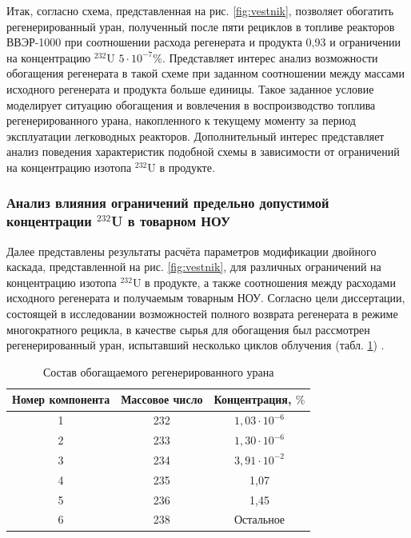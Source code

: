Итак, согласно \cite{smirnovObogashchenieRegenerirovannogoUrana2018} схема, представленная на рис. \ref{fig:vestnik}, позволяет обогатить регенерированный уран, полученный после пяти рециклов в топливе реакторов ВВЭР-1000 при соотношении расхода регенерата и продукта 0,93 и ограничении на концентрацию $^{232}$U $5\cdot10^{-7}$\%. Представляет интерес анализ возможности обогащения регенерата в такой схеме при заданном соотношении между массами исходного регенерата и продукта больше единицы. Такое заданное условие моделирует ситуацию обогащения и вовлечения в воспроизводство топлива регенерированного урана, накопленного к текущему моменту за период эксплуатации легководных реакторов. Дополнительный интерес представляет анализ поведения характеристик подобной схемы в зависимости от ограничений на концентрацию изотопа $^{232}$U в продукте. 

\subsubsection{Анализ влияния ограничений предельно допустимой концентрации $^{232}$U в товарном НОУ}

Далее представлены результаты расчёта параметров модификации двойного каскада, представленной на рис. \ref{fig:vestnik}, для различных ограничений на концентрацию изотопа $^{232}$U в продукте, а также соотношения между расходами исходного регенерата и получаемым товарным НОУ.
Согласно цели диссертации, состоящей в исследовании возможностей полного возврата регенерата в режиме многократного рецикла, в качестве сырья для обогащения был рассмотрен регенерированный уран, испытавший несколько циклов облучения (табл. \ref{RepU_fifth}) \cite{palkinDesignanalyticalResearchRefinement2010}.

\begin{table}
  \begin{tabular}{c|c|c} 
  \hline
  Номер компонента & Массовое число & Концентрация, $\%$ \\
  \hline 1 & 232 & $1,03 \cdot 10^{-6}$ \\
  2 & 233 & $1,30 \cdot 10^{-6}$ \\
  3 & 234 & $3,91 \cdot 10^{-2}$ \\
  4 & 235 & 1,07 \\
  5 & 236 & 1,45 \\
  6 & 238 & Остальное \\
  \hline
  \end{tabular}
\caption{Состав обогащаемого регенерированного урана}\label{RepU_fifth}
\end{table}

